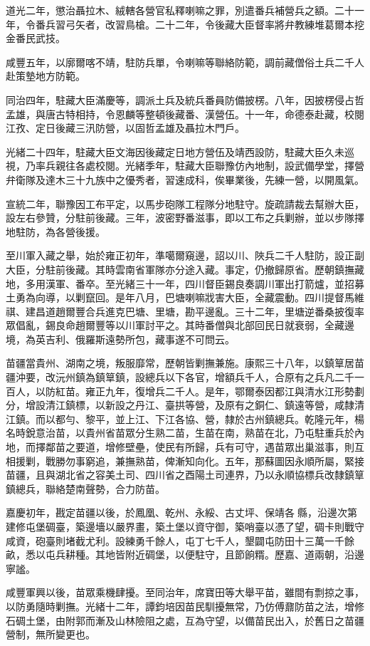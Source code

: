 \begin{pinyinscope}
道光二年，懲治聶拉木、絨轄各營官私釋喇嘛之罪，別遣番兵補營兵之額。二十一年，令番兵習弓矢者，改習鳥槍。二十二年，令後藏大臣督率將弁教練堆葛爾本挖金番民武技。

咸豐五年，以廓爾喀不靖，駐防兵單，令喇嘛等聯絡防範，調前藏僧俗土兵二千人赴策墊地方防範。

同治四年，駐藏大臣滿慶等，調派土兵及統兵番員防備披楞。八年，因披楞侵占哲孟雄，與唐古特相持，令恩麟等整頓後藏番、漢營伍。十一年，命德泰赴藏，校閱江孜、定日後藏三汛防營，以固哲孟雄及聶拉木門戶。

光緒二十四年，駐藏大臣文海因後藏定日地方營伍及靖西設防，駐藏大臣久未巡視，乃率兵親往各處校閱。光緒季年，駐藏大臣聯豫仿內地制，設武備學堂，擇營弁衛隊及達木三十九族中之優秀者，習速成科，俟畢業後，先練一營，以開風氣。

宣統二年，聯豫因工布平定，以馬步砲隊工程隊分地駐守。旋疏請裁去幫辦大臣，設左右參贊，分駐前後藏。三年，波密野番滋事，即以工布之兵剿辦，並以步隊擇地駐防，為各營後援。

至川軍入藏之舉，始於雍正初年，準噶爾窺邊，詔以川、陜兵二千人駐防，設正副大臣，分駐前後藏。其時雲南省軍隊亦分途入藏。事定，仍撤歸原省。歷朝鎮撫藏地，多用漢軍、番卒。至光緒三十一年，四川督臣錫良奏調川軍出打箭爐，並招募土勇為向導，以剿竄回。是年八月，巴塘喇嘛戕害大臣，全藏震動。四川提督馬維祺、建昌道趙爾豐合兵進克巴塘、里塘，勘平邊亂。三十二年，里塘逆番桑披復率眾倡亂，錫良命趙爾豐等以川軍討平之。其時番僧與北部回民日就衰弱，全藏邊境，為英吉利、俄羅斯遠勢所包，藏事遂不可問云。

苗疆當貴州、湖南之境，叛服靡常，歷朝皆剿撫兼施。康熙三十八年，以鎮筸居苗疆沖要，改沅州鎮為鎮筸鎮，設總兵以下各官，增額兵千人，合原有之兵凡二千一百人，以防紅苗。雍正九年，復增兵二千人。是年，鄂爾泰因都江與清水江形勢劃分，增設清江鎮標，以新設之丹江、臺拱等營，及原有之銅仁、鎮遠等營，咸隸清江鎮。而以都勻、黎平，並上江、下江各協、營，隸於古州鎮總兵。乾隆元年，楊名時銳意治苗，以貴州省苗眾分生熟二苗，生苗在南，熟苗在北，乃屯駐重兵於內地，而擇鄰苗之要道，增修壁壘，使民有所歸，兵有可守，遇苗眾出巢滋事，則互相援剿，戰勝勿事窮追，兼撫熟苗，俾漸知向化。五年，那蘇圖因永順所屬，緊接苗疆，且與湖北省之容美土司、四川省之酉陽土司連界，乃以永順協標兵改隸鎮筸鎮總兵，聯絡楚南聲勢，合力防苗。

嘉慶初年，戡定苗疆以後，於鳳凰、乾州、永綏、古丈坪、保靖各縣，沿邊次第建修屯堡碉臺，築邊墻以嚴界畫，築土堡以資守御，築哨臺以憑了望，碉卡則戰守咸資，砲臺則堵截尤利。設練勇千餘人，屯丁七千人，墾闢屯防田十三萬一千餘畝，悉以屯兵耕種。其地皆附近碉堡，以便駐守，且節餉糈。歷嘉、道兩朝，沿邊寧謐。

咸豐軍興以後，苗眾乘機肆擾。至同治年，席寶田等大舉平苗，雖間有剽掠之事，以防勇隨時剿撫。光緒十二年，譚鈞培因苗民馴擾無常，乃仿傅鼐防苗之法，增修石碉土堡，由附郭而漸及山林險阻之處，互為守望，以備苗民出入，於舊日之苗疆營制，無所變更也。


\end{pinyinscope}
